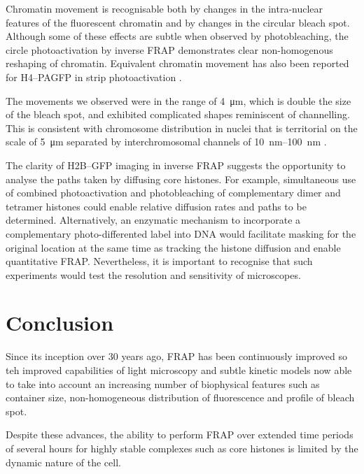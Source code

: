     Chromatin movement is recognisable both
    by changes in the intra-nuclear features of the fluorescent chromatin
    and by changes in the circular bleach spot.
    Although some of these effects are subtle when observed by photobleaching,
    the circle photoactivation by inverse FRAP demonstrates
    clear non-homogenous reshaping of chromatin.
    Equivalent chromatin movement has also been reported
    for H4--PAGFP in strip photoactivation \cite{H4PAGFP-chromatin-movement}.

    The movements we observed were in the
    range of \SI{4}{\um}, which is double the size of the bleach spot,
    and exhibited complicated shapes reminiscent of channelling.
    This is consistent with chromosome distribution in nuclei that is
    territorial on the scale of \SI{5}{\um} \citep{sun2000size}
    separated by interchromosomal channels of
    \SIrange{10}{100}{\nm} \citep{gorisch2005histone}.

    The clarity of H2B--GFP imaging in inverse FRAP
    suggests the opportunity to analyse the
    paths taken by diffusing core histones.
    For example, simultaneous use of combined
    photoactivation and photobleaching
    of complementary dimer and tetramer histones could
    enable relative diffusion rates and paths to be determined.
    Alternatively, an enzymatic mechanism to incorporate a
    complementary photo-differented label
    into DNA  would facilitate masking for
    the original location at the same time as tracking the histone diffusion
    and enable quantitative FRAP.
    Nevertheless, it is important to recognise
    that such experiments would test the
    resolution and sensitivity of microscopes.

\section{Conclusion}

    Since its inception over 30 years ago, FRAP has been continuously improved
    so teh improved capabilities of light microscopy
    and subtle kinetic models now able to take into account
    an increasing number of biophysical features such as container size,
    non-homogeneous distribution of fluorescence and profile of bleach spot.

    Despite these advances, the ability to perform FRAP
    over extended time periods of several hours for highly stable complexes
    such as core histones is limited by the dynamic nature of the cell.

